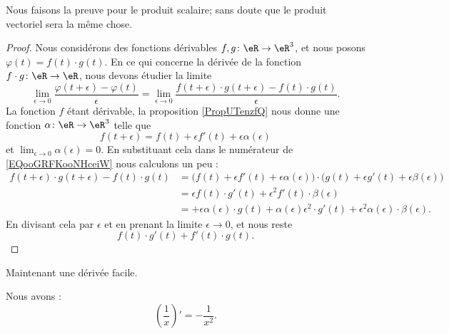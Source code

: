 Nous faisons la preuve pour le produit scalaire; sans doute que le produit vectoriel sera la même chose.
\begin{proof}
    Nous considérons des fonctions dérivables \( f,g\colon \eR\to \eR^3\), et nous posons \( \varphi(t)=f(t)\cdot g(t)\). En ce qui concerne la dérivée de la fonction \( f\cdot g\colon \eR\to \eR\), nous devons étudier la limite
    \begin{equation}        \label{EQooGRFKooNHceiW}
        \lim_{\epsilon\to 0}\frac{ \varphi(t+\epsilon)-\varphi(t) }{ \epsilon }=\lim_{\epsilon\to 0}\frac{ f(t+\epsilon)\cdot g(t+\epsilon)-f(t)\cdot g(t) }{ \epsilon }.
    \end{equation}
    La fonction \( f\) étant dérivable, la proposition \ref{PropUTenzfQ} nous donne une fonction \( \alpha\colon \eR\to \eR^3\) telle que
    \begin{equation}
        f(t+\epsilon)=f(t)+\epsilon f'(t)+\epsilon\alpha(\epsilon)
    \end{equation}
    et \( \lim_{\epsilon\to 0}\alpha(\epsilon)=0\). En substituant cela dans le numérateur de \eqref{EQooGRFKooNHceiW} nous calculons un peu :
    \begin{subequations}
        \begin{align}
            f(t+\epsilon)\cdot g(t+\epsilon)-f(t)\cdot g(t)&=\big( f(t)+\epsilon f'(t)+\epsilon \alpha(\epsilon) \big)\cdot\big( g(t)+\epsilon g'(t)+\epsilon\beta(\epsilon) \big)\\
            &=\epsilon f(t)\cdot g'(t)+\epsilon^2 f'(t)\cdot \beta(\epsilon)\\
            &=+\epsilon\alpha(\epsilon)\cdot g(t)+\alpha(\epsilon)\epsilon^2\cdot g'(t)+\epsilon^2\alpha(\epsilon)\cdot \beta(\epsilon).
        \end{align}
    \end{subequations}
    En divisant cela par \( \epsilon\) et en prenant la limite \( \epsilon\to 0\), et nous reste
    \begin{equation}
        f(t)\cdot g'(t)+f'(t)\cdot g(t).
    \end{equation}
\end{proof}

Maintenant une dérivée facile.
\begin{lemma}
    Nous avons :
    \begin{equation}
        \left( \frac{1}{ x } \right)'=-\frac{1}{ x^2 }.
    \end{equation}
\end{lemma}

